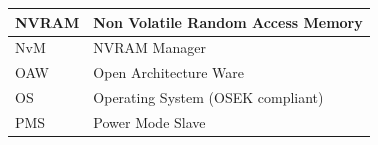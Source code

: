 \begin{longtable}{|l|l|}
\begin{minipage}{0.31\linewidth}\raggedright\vspace{.75ex}NVRAM\vspace{.75ex}\end{minipage} & \begin{minipage}{0.63\linewidth}\raggedright\vspace{.75ex}Non Volatile Random Access Memory\vspace{.75ex}\end{minipage}\\\hline
\begin{minipage}{0.31\linewidth}\raggedright\vspace{.75ex}NvM\vspace{.75ex}\end{minipage} & \begin{minipage}{0.63\linewidth}\raggedright\vspace{.75ex}NVRAM Manager\vspace{.75ex}\end{minipage}\\\hline
\begin{minipage}{0.31\linewidth}\raggedright\vspace{.75ex}OAW\vspace{.75ex}\end{minipage} & \begin{minipage}{0.63\linewidth}\raggedright\vspace{.75ex}Open Architecture Ware\vspace{.75ex}\end{minipage}\\\hline
\begin{minipage}{0.31\linewidth}\raggedright\vspace{.75ex}OS\vspace{.75ex}\end{minipage} & \begin{minipage}{0.63\linewidth}\raggedright\vspace{.75ex} Operating System (OSEK compliant)\vspace{.75ex}\end{minipage}\\\hline
\begin{minipage}{0.31\linewidth}\raggedright\vspace{.75ex}PMS\vspace{.75ex}\end{minipage} & \begin{minipage}{0.63\linewidth}\raggedright\vspace{.75ex}Power Mode Slave\vspace{.75ex}\end{minipage}\\\hline

\end{longtable}
